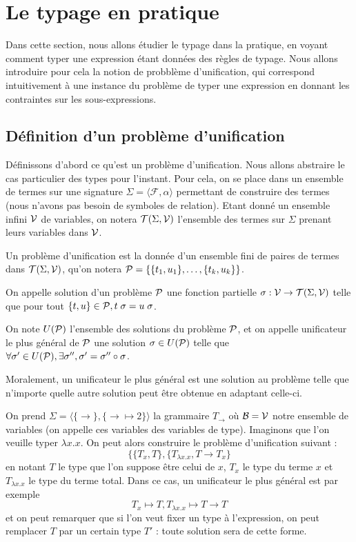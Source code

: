 \section{Le typage en pratique}

Dans cette section, nous allons étudier le typage dans la pratique, en voyant comment typer une expression étant données des règles de typage. Nous allons introduire pour cela la notion de probblème d'unification, qui correspond intuitivement à une instance du problème de typer une expression en donnant les contraintes sur les sous-expressions.

\subsection{Définition d'un problème d'unification}

Définissons d'abord ce qu'est un problème d'unification. Nous allons abstraire le cas particulier des types pour l'instant. Pour cela, on se place dans un ensemble de termes sur une signature $\Sigma = \langle \mathcal F,\alpha\rangle$ permettant de construire des termes (nous n'avons pas besoin de symboles de relation). Etant donné un ensemble infini $\mathcal V$ de variables, on notera $\mathcal T(\Sigma,\mathcal V)$ l'ensemble des termes sur $\Sigma$ prenant leurs variables dans $\mathcal V$.

\begin{defi}
    Un problème d'unification est la donnée d'un ensemble fini de paires de termes dans $\mathcal T(\Sigma,\mathcal V)$, qu'on notera $\mathcal P = \{ \{t_1,u_1\},\ldots,\{t_k,u_k\}\}$.

    On appelle solution d'un problème $\mathcal P$ une fonction partielle $\sigma : \mathcal V\to \mathcal T(\Sigma,\mathcal V)$ telle que pour tout $\{t,u\}\in\mathcal P, t\;\sigma = u\;\sigma$.

    On note $U(\mathcal P)$ l'ensemble des solutions du problème $\mathcal P$, et on appelle unificateur le plus général de $\mathcal P$ une solution $\sigma\in U(\mathcal P)$ telle que $\forall \sigma'\in U(\mathcal P), \exists \sigma'', \sigma'=\sigma''\circ \sigma$.
\end{defi}

Moralement, un unificateur le plus général est une solution au problème telle que n'importe quelle autre solution peut être obtenue en adaptant celle-ci.

\begin{expl}
    On prend $\Sigma = \langle \{\to\},\{\to\mapsto 2\}\rangle$ la grammaire $T_\to$ où $\mathcal B = \mathcal V$ notre ensemble de variables (on appelle ces variables des variables de type). Imaginons que l'on veuille typer $\lambda x.x$. On peut alors construire le problème d'unification suivant : $$\{\{T_x,T\},\{T_{\lambda x.x},T\to T_x\}$$ en notant $T$ le type que l'on suppose être celui de $x$, $T_x$ le type du terme $x$ et $T_{\lambda x.x}$ le type du terme total. Dans ce cas, un unificateur le plus général est par exemple $$T_x\mapsto T, T_{\lambda x.x}\mapsto T\to T$$ et on peut remarquer que si l'on veut fixer un type à l'expression, on peut remplacer $T$ par un certain type $T'$ : toute solution sera de cette forme.
\end{expl}

